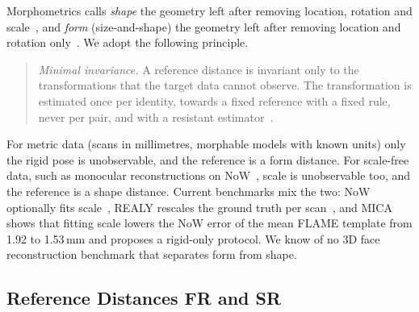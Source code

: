 Morphometrics calls \emph{shape} the geometry left after removing location,
rotation and scale~\cite{kendall1984shape,kendall1989survey}, and \emph{form}
(size-and-shape) the geometry left after removing location and rotation
only~\cite{dryden2016statistical,klingenberg2016size}. We adopt the following
principle.

\begin{quote}
\emph{Minimal invariance.} A reference distance is invariant only to the
transformations that the target data cannot observe. The transformation is
estimated once per identity, towards a fixed reference with a fixed rule,
never per pair, and with a resistant estimator~\cite{siegel1982resistant,rohlf1990extensions}.
\end{quote}

\noindent
For metric data (scans in millimetres, morphable models with known units)
only the rigid pose is unobservable, and the reference is a form distance.
For scale-free data, such as monocular reconstructions on NoW~\cite{now},
scale is unobservable too, and the reference is a shape distance. Current
benchmarks mix the two: NoW optionally fits scale~\cite{now}, REALY rescales
the ground truth per scan~\cite{REALY}, and MICA~\cite{mica} shows that
fitting scale lowers the NoW error of the mean FLAME template from 1.92 to
1.53\,mm and proposes a rigid-only protocol.
We know of no 3D face reconstruction benchmark that separates form from shape.

\subsection{Reference Distances FR and SR}
\label{sec:gt_definition}

